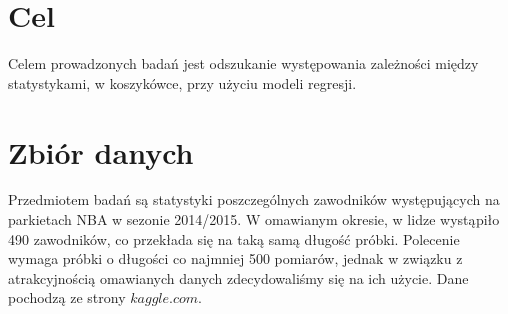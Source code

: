 \documentclass[11pt,a4paper]{article}
\author{Kamil Zawistowski, Michał Cerazy}
\begin{document}
\tableofcontents
\newpage
\section{Cel}
Celem prowadzonych badań jest odszukanie występowania zależności między statystykami, w koszykówce, przy użyciu modeli regresji. 

\section{Zbiór danych}
Przedmiotem badań są statystyki poszczególnych zawodników występujących na parkietach NBA w sezonie 2014/2015. W omawianym okresie, w lidze wystąpiło 490 zawodników, co przekłada się na taką samą długość próbki. Polecenie wymaga próbki o długości co najmniej 500 pomiarów, jednak w związku z atrakcyjnością omawianych danych zdecydowaliśmy się na ich użycie. Dane pochodzą ze strony $kaggle.com$. 
\end{document}
